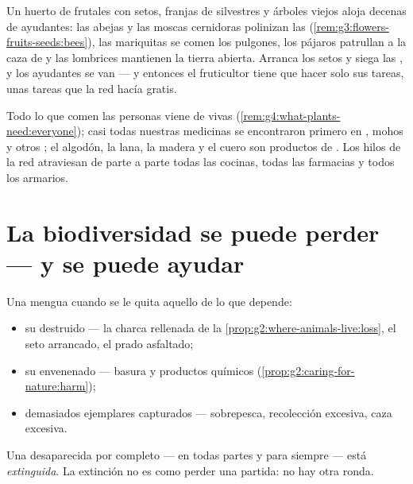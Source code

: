 \begin{example}\label{ex:g5:biodiversity:orchard}
Un huerto de frutales con setos, franjas de  silvestres y
árboles viejos aloja decenas de  ayudantes: las abejas y las
moscas cernidoras polinizan las 
(\cref{rem:g3:flowers-fruits-seeds:bees}), las mariquitas se comen los
pulgones, los pájaros patrullan a la caza de  y las lombrices
mantienen la tierra abierta. Arranca los setos y siega las , y
los ayudantes se van --- y entonces el fruticultor tiene que hacer
solo sus tareas, unas tareas que la red hacía gratis.
\end{example}

\begin{example}\label{ex:g5:biodiversity:people}
Todo lo que comen las personas viene de  vivas
(\cref{rem:g4:what-plants-need:everyone}); casi todas nuestras
medicinas se encontraron primero en , mohos y otros ; el algodón, la lana, la madera y el cuero son productos de
. Los hilos de la red atraviesan de parte a parte todas las
cocinas, todas las farmacias y todos los armarios.
\end{example}

\section{La biodiversidad se puede perder --- y se puede ayudar}

\begin{proposition}\label{prop:g5:biodiversity:loss}
Una  mengua cuando se le quita aquello de lo que depende:
\begin{itemize}
  \item su \emph{} destruido --- la charca rellenada de la
        \cref{prop:g2:where-animals-live:loss}, el seto arrancado, el
        prado asfaltado;
  \item su  envenenado --- basura y productos químicos
        (\cref{prop:g2:caring-for-nature:harm});
  \item demasiados ejemplares capturados --- sobrepesca, recolección
        excesiva, caza excesiva.
\end{itemize}
Una  desaparecida por completo --- en todas partes y para
siempre --- está \emph{extinguida}. La extinción no
es como perder una partida: no hay otra ronda.
\end{proposition}
\admitted

